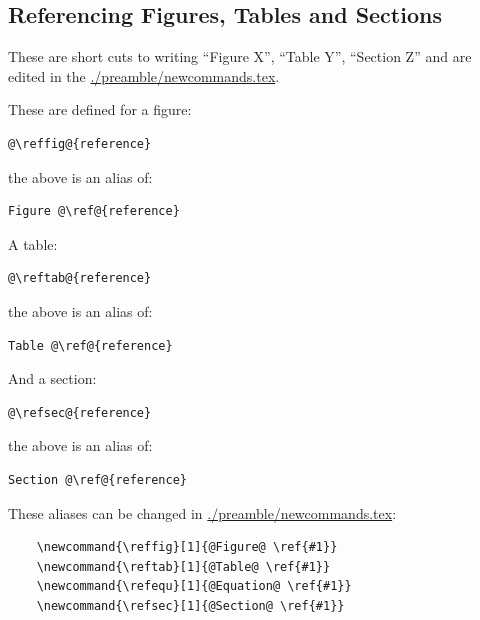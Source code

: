 \subsection{Referencing Figures, Tables and Sections}
    \label{ch1_section_ref_fig_tab_sec}

    These are short cuts to writing ``Figure X'', ``Table Y'', ``Section Z'' and are edited in the \url{./preamble/newcommands.tex}.

    These are defined for a figure:

    \begin{lstlisting}[style=base]
    @\reffig@{reference}
    \end{lstlisting}

    \noindent the above is an alias of:

    \begin{lstlisting}[style=base]
    Figure @\ref@{reference}
    \end{lstlisting}

    A table:

    \begin{lstlisting}[style=base]
    @\reftab@{reference}
    \end{lstlisting}

    \noindent the above is an alias of:

    \begin{lstlisting}[style=base]
    Table @\ref@{reference}
    \end{lstlisting}

    And a section:

    \begin{lstlisting}[style=base]
    @\refsec@{reference}
    \end{lstlisting}

    \noindent the above is an alias of:

    \begin{lstlisting}[style=base]
    Section @\ref@{reference}
    \end{lstlisting}
    
    \noindent These aliases can be changed in \url{./preamble/newcommands.tex}:

    \begin{lstlisting}[style=base]
    %referencing sections, figures, tables, equations
    \newcommand{\reffig}[1]{@Figure@ \ref{#1}}
    \newcommand{\reftab}[1]{@Table@ \ref{#1}}
    \newcommand{\refequ}[1]{@Equation@ \ref{#1}}
    \newcommand{\refsec}[1]{@Section@ \ref{#1}}
    \end{lstlisting}

